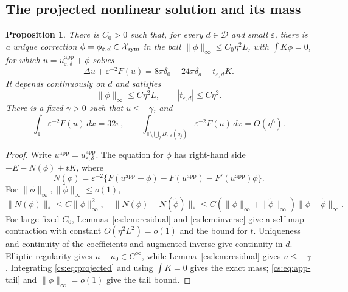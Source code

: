 \documentclass[11pt,reqno]{amsart}
\numberwithin{equation}{section}
\newtheorem{proposition}[theorem]{Proposition}
\theoremstyle{definition}
\theoremstyle{remark}
\newcommand{\T}{\mathbb T}
\newcommand{\eps}{\varepsilon}
\newcommand{\dd}{\,dx}
\begin{document}
\subsection{The projected nonlinear solution and its mass}

\begin{proposition}\label{cs:prop:projected}
There is $C_0>0$ such that, for every $d\in\mathcal D$ and small
$\eps$, there is a unique correction $\phi=\phi_{\eps,d}\in\mathcal X_{\rm sym}$
in the ball $\|\phi\|_\infty\le C_0\eta^2L$, with
$\int K\phi=0$, for which $u=u^{\mathrm{app}}_{\eps,\delta}+\phi$ solves
\begin{equation}\label{cs:eq:projected}
 \Delta u+\eps^{-2}F(u)
       =8\pi\delta_0+24\pi\delta_a+t_{\eps,d}K.
\end{equation}
It depends continuously on $d$ and satisfies
\begin{equation}\label{cs:eq:phi-bound}
 \|\phi\|_\infty\le C\eta^2L,\qquad |t_{\eps,d}|\le C\eta^2.
\end{equation}
There is a fixed $\gamma>0$ such that $u\le-\gamma$, and
\begin{equation}\label{cs:eq:mass}
 \int_\T\eps^{-2}F(u)\dd=32\pi,\qquad
 \int_{\T\setminus\bigcup_jB_{r_c\delta}(q_j)}
                     \eps^{-2}F(u)\dd=O(\eta^6).
\end{equation}
\end{proposition}

\begin{proof}
Write $u^{\mathrm{app}}=u^{\mathrm{app}}_{\eps,\delta}$. The equation for $\phi$ has right-hand side
$-E-N(\phi)+tK$, where
\[
 N(\phi)=\eps^{-2}\{F(u^{\mathrm{app}}+\phi)-F(u^{\mathrm{app}})-F'(u^{\mathrm{app}})\phi\}.
\]
For $\|\phi\|_\infty,\|\widetilde\phi\|_\infty\le o(1)$,
\[
 \|N(\phi)\|_*\le C\|\phi\|_\infty^2,\quad
 \|N(\phi)-N(\widetilde\phi)\|_*
 \le C(\|\phi\|_\infty+\|\widetilde\phi\|_\infty)
                                      \|\phi-\widetilde\phi\|_\infty .
\]
For large fixed $C_0$, Lemmas~\ref{cs:lem:residual} and
\ref{cs:lem:inverse} give a self-map contraction with constant
$O(\eta^2L^2)=o(1)$ and the bound for $t$.
Uniqueness and continuity of the coefficients and augmented inverse
give continuity in $d$. Elliptic regularity gives $u-u_0\in C^\infty$,
while Lemma~\ref{cs:lem:residual} gives $u\le-\gamma$.
Integrating \eqref{cs:eq:projected} and using $\int K=0$ gives the exact
mass; \eqref{cs:eq:app-tail} and $\|\phi\|_\infty=o(1)$ give the tail bound.
\end{proof}
\end{document}
